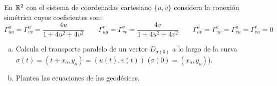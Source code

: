  \begin{ejer}
     [5.18] En $\mathbb{R}^2$ con el sistema de coordenadas cartesiano $\{u, v\}$ considera la conexi\'on sim\'etrica cuyos coeficientes son:
     $$\Gamma_{uu}^u=\Gamma_{vv}^u = \dfrac{4u}{1+4u^2+4v^2} \qquad \Gamma_{uu}^v=\Gamma_{vv}^v = \dfrac{4v}{1+4u^2+4v^2} \qquad \Gamma_{uv}^u=\Gamma_{uv}^v=\Gamma_{vu}^u=\Gamma_{vu}^v=0$$
        \begin{enumerate}[a)]
            \item Calcula el transporte paralelo de un vector $D_{\sigma(0)}$ a lo largo de la curva $\sigma(t) = (t + x_o, y_o)=(u(t),v(t))$ ($\sigma(0)=(x_o,y_o)$).
            \item Plantea las ecuaciones de las geod\'esicas.
        \end{enumerate}
\end{ejer}
